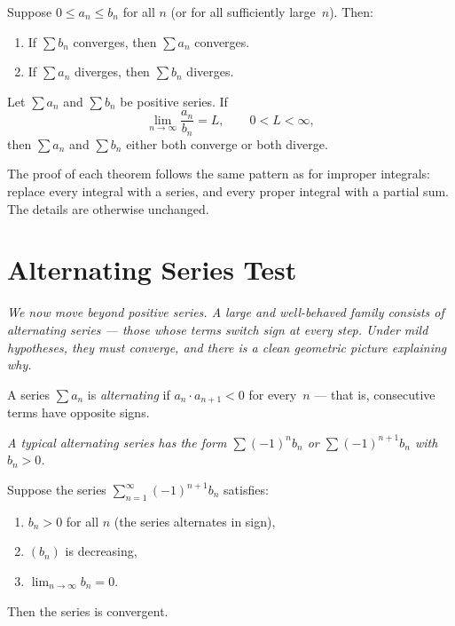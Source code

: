 \begin{theorem}
\label{thm:13-9}
Suppose $0 \le a_{n} \le b_{n}$ for all $n$ (or for all sufficiently large~$n$).  Then:
\begin{enumerate}[label=(\roman*)]
  \item If $\sum b_{n}$ converges, then $\sum a_{n}$ converges.
  \item If $\sum a_{n}$ diverges, then $\sum b_{n}$ diverges.
\end{enumerate}
\end{theorem}

\begin{theorem}
\label{thm:13-10}
Let $\sum a_{n}$ and $\sum b_{n}$ be positive series.  If
\[
  \lim_{n\to\infty}\frac{a_{n}}{b_{n}} = L, \qquad 0<L<\infty,
\]
then $\sum a_{n}$ and $\sum b_{n}$ either both converge or both diverge.
\end{theorem}

\begin{remark}
The proof of each theorem follows the same pattern as for improper integrals: replace every integral with a series, and every proper integral with a partial sum.  The details are otherwise unchanged.
\end{remark}

\section{Alternating Series Test}
\label{sec:13.13}

\textit{We now move beyond positive series.  A large and well-behaved family consists of alternating series --- those whose terms switch sign at every step.  Under mild hypotheses, they must converge, and there is a clean geometric picture explaining why.}

\begin{definition}
\label{def:13-4}
A series $\sum a_{n}$ is \emph{alternating} if $a_{n}\cdot a_{n+1}<0$ for every~$n$ --- that is, consecutive terms have opposite signs.
\end{definition}

\textit{A typical alternating series has the form $\sum(-1)^{n}b_{n}$ or $\sum(-1)^{n+1}b_{n}$ with $b_{n}>0$.}

\begin{theorem}
\label{thm:13-11}
Suppose the series $\sum_{n=1}^{\infty}(-1)^{n+1}b_{n}$ satisfies:
\begin{enumerate}[label=(\roman*)]
  \item $b_{n}>0$ for all $n$ \textup{(}the series alternates in sign\textup{)},
  \item $(b_{n})$ is decreasing,
  \item $\lim_{n\to\infty}b_{n}=0$.
\end{enumerate}
Then the series is convergent.
\end{theorem}

